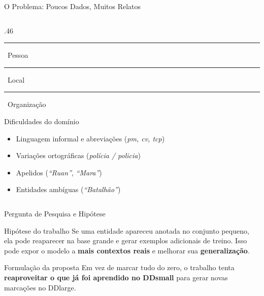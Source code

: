 \documentclass[aspectratio=169, 9pt]{beamer}
\begin{document}
\begin{frame}{O Problema: Poucos Dados, Muitos Relatos}
\begin{columns}[T]
\begin{column}{.46\textwidth}
      \vspace{6pt}
      {\footnotesize
      \textcolor{azul!80!black}{\rule{8pt}{6pt}}~Pessoa \quad
      \textcolor{verde!70!black}{\rule{8pt}{6pt}}~Local \quad
      \textcolor{amarelo!80!black}{\rule{8pt}{6pt}}~Organização
      }

      \vspace{10pt}
      \begin{alertblock}{Dificuldades do domínio}
        \begin{itemize}
          \item Linguagem informal e abreviações (\emph{pm, cv, tcp})
          \item Variações ortográficas (\emph{polícia / policia})
          \item Apelidos (\emph{``Ruan''}, \emph{``Mara''})
          \item Entidades ambíguas (\emph{``Batalhão''})
        \end{itemize}
      \end{alertblock}
    \end{column}
  \end{columns}
\end{frame}


\begin{frame}{Pergunta de Pesquisa e Hipótese}
  \begin{block}{Hipótese do trabalho}
    Se uma entidade apareceu anotada no conjunto pequeno, ela pode reaparecer na base grande e gerar exemplos adicionais de treino. Isso pode expor o modelo a \textbf{mais contextos reais} e melhorar sua \textbf{generalização}.
  \end{block}

  \vspace{10pt}
  \begin{center}
  \end{center}

  \vspace{10pt}
  \begin{exampleblock}{Formulação da proposta}
    Em vez de marcar tudo do zero, o trabalho tenta \textbf{reaproveitar o que já foi aprendido no DDsmall} para gerar novas marcações no DDlarge.
  \end{exampleblock}
\end{frame}
\end{document}
